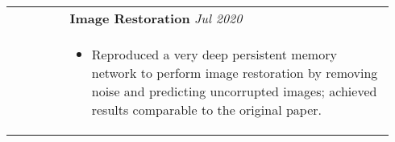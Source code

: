 \documentclass[letterpaper, 10pt, oneside]{article}
\newcommand{\bdit}[1]{{\textbf{#1}}}
\begin{document}
\begin{longtable}{@{} p{0.14\linewidth} p{0.8\linewidth}}
    \\[-1.4ex]
                         & \bdit{Image Restoration} \hfill \textsl{Jul 2020}                                                                                                                                                                        \\
                         & \parbox{0.8\textwidth}{                                                                                                                                                                                                  %
        \begin{itemize}[leftmargin=*, itemsep=-0.88ex, topsep=0.2ex]
            \item Reproduced a very deep persistent memory network to perform image restoration by removing noise and predicting uncorrupted images; achieved results comparable to the original paper.
        \end{itemize}
    }                                                                                                                                                                                                                                               \\
    \\[-1.4ex]



\end{longtable}
\end{document}
